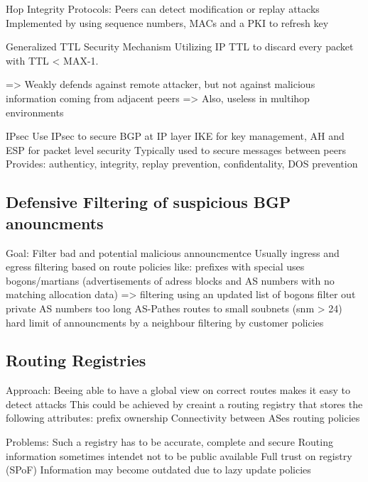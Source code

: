 \documentclass[12pt]{IEEEtran}
\begin{document}
			Hop Integrity Protocols:
				Peers can detect modification or replay attacks	
				Implemented by using sequence numbers, MACs and a PKI to refresh key

			Generalized TTL Security Mechanism
				Utilizing IP TTL to discard every packet with TTL < MAX-1. 
				
				=> Weakly defends against remote attacker, but not against malicious information coming from adjacent peers
				=> Also, useless in multihop environments
				
			IPsec
				Use IPsec to secure BGP at IP layer 
				IKE for key management, AH and ESP for packet level security
				Typically used to secure messages between peers
				Provides: authenticy, integrity, replay prevention, confidentality, DOS prevention
			


       \subsection{Defensive Filtering of suspicious BGP anouncments}
	Goal: Filter bad and potential malicious announcmentce 
	Usually ingress and egress filtering based on route policies like:
			prefixes with special uses
			bogons/martians (advertisements of adress blocks and AS numbers with no matching allocation data)
				=> filtering using an updated list of bogons
			filter out private AS numbers
			too long AS-Pathes
			routes to small soubnets (snm > 24) 
			hard limit of announcments by a neighbour 
			filtering by customer policies
				

       \subsection{Routing Registries}
		Approach: Beeing able to have a global view on correct routes makes it easy to detect attacks
		This could be achieved by creaint a routing registry that stores the following attributes:
			prefix ownership
			Connectivity between ASes
			routing policies
			
		Problems: 
			Such a registry has to be accurate, complete and secure
			Routing information sometimes intendet not to be public available
			Full trust on registry (SPoF)
			Information may become outdated due to lazy update policies
       		
       
       
       		
\end{document}
